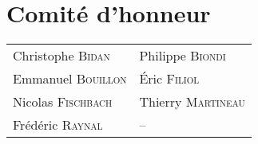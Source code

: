 \begin{minipage}{1.0\linewidth}
  \section*{Comit\'e d'honneur}

  \begin{tabular}{@{}p{5cm}@{}p{5cm}@{}}
    Christophe \textsc{Bidan}  &
    Philippe \textsc{Biondi}   \\

    Emmanuel \textsc{Bouillon} &
    Éric \textsc{Filiol}       \\

    Nicolas \textsc{Fischbach} &
    Thierry \textsc{Martineau} \\

    Frédéric \textsc{Raynal}   &
    --                \\
  \end{tabular}
\end{minipage}

